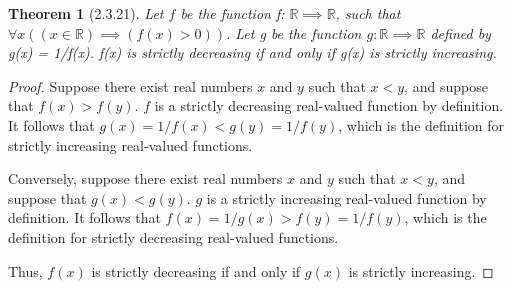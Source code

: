 \documentclass[a4paper, 12pt]{article}
\theoremstyle{plain}
\newtheorem*{theorem*}{Theorem}
\begin{document}
	
	\begin{theorem*}[2.3.21]
		Let $f$ be the function f: $\mathbb{R} \implies \mathbb{R}$, such that \newline $\forall x ((x \in \mathbb{R}) \implies (f(x) > 0))$. Let g be the function $g: \mathbb{R} \implies \mathbb{R}$ defined by g(x) = 1/f(x). f(x) is strictly decreasing if and only if g(x) is strictly increasing.
	\end{theorem*}
	
	\begin{proof}
		Suppose there exist real numbers $x$ and $y$ such that $x < y$, and suppose that $f(x) > f(y)$. $f$ is a strictly decreasing real-valued function by definition. It follows that $g(x) = 1/f(x) < g(y) = 1/f(y)$, which is the definition for strictly increasing real-valued functions.
		
		Conversely, suppose there exist real numbers $x$ and $y$ such that $x < y$, and suppose that $g(x) < g(y)$. $g$ is a strictly increasing real-valued function by definition. It follows that $f(x) = 1/g(x) > f(y) = 1/f(y)$, which is the definition for strictly decreasing real-valued functions.
		
		Thus, $f(x)$ is strictly decreasing if and only if $g(x)$ is strictly increasing.
	\end{proof}
\end{document}
